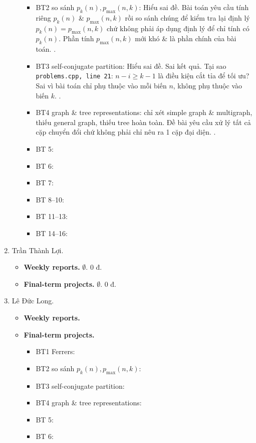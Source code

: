 \documentclass{article}
\begin{document}
\begin{enumerate}
\begin{itemize}
\begin{itemize}
            \item BT2 so sánh $p_k(n),p_{\max}(n,k)$: Hiểu sai đề. Bài toán yêu cầu tính riêng $p_k(n)$ \& $p_{\max}(n,k)$ rồi so sánh chúng để kiểm tra lại định lý $p_k(n) = p_{\max}(n,k)$ chứ không phải áp dụng định lý để chỉ tính có $p_k(n)$. Phần tính $p_{\max}(n,k)$ mới khó \& là phần chính  của bài toán. .
            \item BT3 self-conjugate partition: Hiểu sai đề. Sai kết quả. Tại sao {\tt problems.cpp, line 21}: $n - i\ge k - 1$ là điều kiện cắt tỉa để tối ưu? Sai vì bài toán chỉ phụ thuộc vào mỗi biến $n$, không phụ thuộc vào biến $k$. .
            \item BT4 graph \& tree representations: chỉ xét simple graph \& multigraph, thiếu general graph, thiếu tree hoàn toàn. Đề bài yêu cầu xử lý tất cả cặp chuyển đổi chứ không phải chỉ nêu ra 1 cặp đại diện. .
            \item BT 5:
            \item BT 6:
            \item BT 7:
            \item BT 8--10:
            \item BT 11--13:
            \item BT 14--16:
        \end{itemize}
    \end{itemize}
    \item {\sc Trần Thành Lợi.}
    \begin{itemize}
        \item {\bf Weekly reports.} $\emptyset$. 0 đ.
        \item {\bf Final-term projects.} $\emptyset$. 0 đ.
    \end{itemize}
    \item {\sc Lê Đức Long.}
    \begin{itemize}
        \item {\bf Weekly reports.}
        \item {\bf Final-term projects.}
        \begin{itemize}
            \item BT1 Ferrers:
            \item BT2 so sánh $p_k(n),p_{\max}(n,k)$:
            \item BT3 self-conjugate partition:
            \item BT4 graph \& tree representations:
            \item BT 5:
            \item BT 6:

\end{itemize}
\end{itemize}
\end{enumerate}
\end{document}
